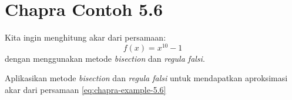 \section{Chapra Contoh 5.6}

Kita ingin menghitung akar dari persamaan:
\begin{equation}
f(x) = x^{10} - 1
\label{eq:chapra-example-5.6}
\end{equation}
dengan menggunakan metode \textit{bisection} dan \textit{regula falsi}.

\begin{soal}
Aplikasikan metode \textit{bisection} dan \textit{regula falsi} untuk mendapatkan
aproksimasi akar dari persamaan \eqref{eq:chapra-example-5.6}
\end{soal}